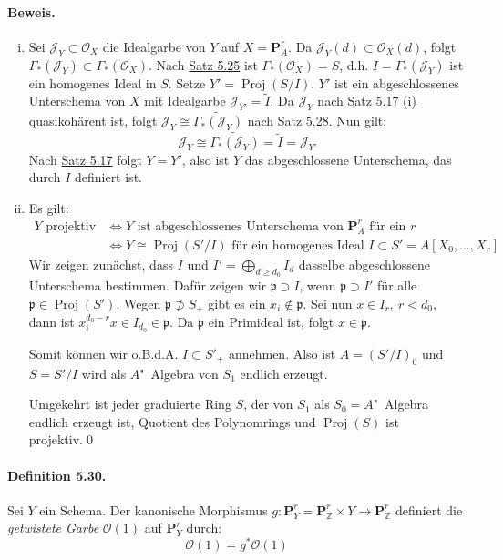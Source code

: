 \paragraph{Beweis.} \begin{enumerate}[(i)]
\item Sei $\mathcal{J}_Y\subset\mathcal{O}_X$ die Idealgarbe von $Y$ auf $X=\mathbf{P}_A^r$. Da $\mathcal{J}_Y(d)\subset\mathcal{O}_X(d)$, folgt $\Gamma_\ast(\mathcal{J}_Y)\subset\Gamma_\ast(\mathcal{O}_X)$. Nach \hyperref[5.25]{Satz 5.25} ist $\Gamma_\ast(\mathcal{O}_X)=S$, d.h. $I=\Gamma_\ast(\mathcal{J}_Y)$ ist ein homogenes Ideal in $S$. Setze $Y'=\operatorname{Proj}(S/I)$. $Y'$ ist ein abgeschlossenes Unterschema von $X$ mit Idealgarbe $\mathcal{J}_{Y'}=\widetilde{I}$. Da $\mathcal{J}_Y$ nach \hyperref[5.17]{Satz 5.17 (i)} quasikohärent ist, folgt $\mathcal{J}_Y\cong\widetilde{\Gamma_\ast(\mathcal{J}_Y)}$ nach \hyperref[5.28]{Satz 5.28}. Nun gilt:
\[\mathcal{J}_Y\cong\widetilde{\Gamma_\ast(\mathcal{J}_Y)}=\widetilde{I}=\mathcal{J}_{Y'} \]
Nach \hyperref[5.17]{Satz 5.17} folgt $Y=Y'$, also ist $Y$ das abgeschlossene Unterschema, das durch $I$ definiert ist.
\item Es gilt:
\begin{align*}
Y\text{ projektiv} &\iff Y\text{ ist abgeschlossenes Unterschema von }\mathbf{P}_A^r\text{ für ein }r\\
&\iff Y\cong\operatorname{Proj}(S'/I)\text{ für ein homogenes Ideal }I\subset S' = A[X_0,\ldots,X_r]
\end{align*}
Wir zeigen zunächst, dass $I$ und $I'=\bigoplus_{d\geq d_0}I_d$ dasselbe abgeschlossene Unterschema bestimmen. Dafür zeigen wir $\mathfrak{p}\supset I$, wenn $\mathfrak{p}\supset I'$ für alle $\mathfrak{p}\in\operatorname{Proj}(S')$. Wegen $\mathfrak{p}\not\supset S_+$ gibt es ein $x_i\not\in\mathfrak{p}$. Sei nun $x\in I_r,\ r<d_0$, dann ist $x_i^{d_0-r}x\in I_{d_0}\in\mathfrak{p}$. Da $\mathfrak{p}$ ein Primideal ist, folgt $x\in\mathfrak{p}$.

Somit können wir o.B.d.A. $I\subset S'_+$ annehmen. Also ist $A=(S'/I)_0$ und $S=S'/I$ wird als $A$"~Algebra von $S_1$ endlich erzeugt.

Umgekehrt ist jeder graduierte Ring $S$, der von $S_1$ als $S_0=A$"~Algebra endlich erzeugt ist, Quotient des Polynomrings und $\operatorname{Proj}(S)$ ist projektiv.\qed
\end{enumerate}

\paragraph{Definition 5.30.}\label{5.30} Sei $Y$ ein Schema. Der kanonische Morphismus $g:\mathbf{P}_Y^r=\mathbf{P}_\mathbb{Z}^r\times Y\to\mathbf{P}_\mathbb{Z}^r$ definiert die \textit{getwistete Garbe} $\mathcal{O}(1)$ auf $\mathbf{P}_Y^r$ durch:
\[\mathcal{O}(1)=g^\ast\mathcal{O}(1) \]

